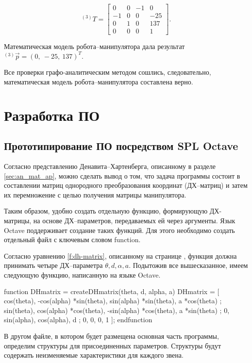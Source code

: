 \documentclass[oneside, final, 14pt]{extarticle}
\begin{document}
\begin{displaymath}
{}^{(3)}T=
\begin{bmatrix}
  0 & 0 & -1 & 0 \\
  -1 & 0 & 0 & -25 \\
  0 & 1 & 0 & 137 \\
  0 & 0 & 0 & 1
\end{bmatrix}
.
\end{displaymath}
\par
Математическая модель робота--манипулятора дала результат \({}^{(3)} \vec p=(0,\:-25,\:137)^T\).
\par
Все проверки графо-аналитическим методом сошлись, следовательно, математическая модель робота--манипулятора составлена верно.

\newpage

\section{Разработка ПО}

\subsection{Прототипирование ПО посредством SPL Octave}
\label{s:prot_matlab}

Согласно представлению Денавита--Хартенберга, описанному в разделе \ref{sec:an_mat_ap}, можно сделать вывод о том, что задача программы состоит в составлении матриц однородного преобразования координат (ДХ--матриц) и затем их перемножение с целью получения матрицы манипулятора.
\par
Таким образом, удобно создать отдельную функцию, формирующую ДХ-матрицы, на основе ДХ--параметров, передаваемых ей через аргументы. Язык Octave поддерживает создание таких функций.
Для этого необходимо создать отдельный файл с ключевым словом {\ttfamily function}.
\par
Согласно уравнению \ref{f:dh-matrix}, описанному на странице \pageref{f:dh-matrix}, функция должна принимать четыре ДХ--параметра \(\theta, d, \alpha, a \).
Подытожив все вышесказанное, имеем следующую функцию, написанную на языке Octave.

{\small \begin{listing}{22}
function DHmatrix = createDHmatrix(theta, d, alpha, a)
DHmatrix = [
  cos(theta), -cos(alpha) *sin(theta), sin(alpha) *sin(theta), a *cos(theta) ;
  sin(theta), cos(alpha) *cos(theta), -sin(alpha) *cos(theta), a *sin(theta) ;
  0,          sin(alpha),             cos(alpha),              d             ;
  0,          0,                      0,                       1
];
endfunction
\end{listing}
}
\par
В другом файле, в котором будет размещена основная часть программы, определим структуры для присоединенных параметров.
Структуры будут содержать неизменяемые характеристики для каждого звена.
\end{document}
